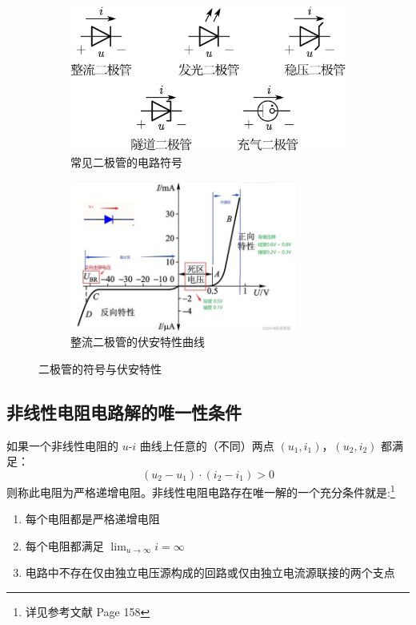 \documentclass[UTF8]{report}
\theoremstyle{MyLineTheoremStyle} %
\theoremstyle{MyBlockTheoremStyle} %
\theoremstyle{MySubsubsectionStyle} %
\begin{document}
\begin{figure}[H]\centering
\begin{subfigure}[t]{0.52\columnwidth}\centering
    \includegraphics[height=135pt]{assets/4/常见二极管.pdf}
    \caption{ 常见二极管的电路符号 }
\end{subfigure}\hfill
\begin{subfigure}[t]{0.48\columnwidth}\centering
    \includegraphics[height=140pt]{assets/4/整流二极管.png}
    \caption{ 整流二极管的伏安特性曲线 }
\end{subfigure}
\caption{二极管的符号与伏安特性}
\end{figure}

\subsection{非线性电阻电路解的唯一性条件}

如果一个非线性电阻的 $u$-$i$ 曲线上任意的（不同）两点 $(u_1, i_1)$，$(u_2, i_2)$ 都满足：
\begin{equation}
(u_2 - u_1) \cdot (i_2 - i_1) > 0
\end{equation}
则称此电阻为严格递增电阻。非线性电阻电路存在唯一解的一个充分条件就是:\footnote{详见参考文献 \cite{电路原理} Page 158}
\begin{enumerate}
\item 每个电阻都是严格递增电阻
\item 每个电阻都满足 $\displaystyle \lim_{u \to \infty}  i = \infty$
\item 电路中不存在仅由独立电压源构成的回路或仅由独立电流源联接的两个支点
\end{enumerate}
\end{document}
